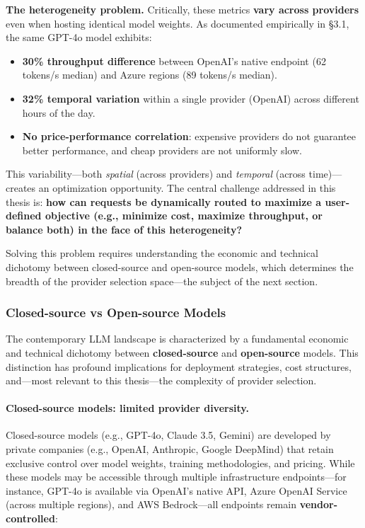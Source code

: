 \documentclass[english]{article}
\begin{document}
\medskip

\noindent\textbf{The heterogeneity problem.}
Critically, these metrics \textbf{vary across providers} even when hosting identical model weights. As documented empirically in §3.1, the same GPT-4o model exhibits:
\begin{itemize}
    \item \textbf{30\% throughput difference} between OpenAI's native endpoint (62 tokens/s median) and Azure regions (89 tokens/s median).
    \item \textbf{32\% temporal variation} within a single provider (OpenAI) across different hours of the day.
    \item \textbf{No price-performance correlation}: expensive providers do not guarantee better performance, and cheap providers are not uniformly slow.
\end{itemize}

This variability—both \emph{spatial} (across providers) and \emph{temporal} (across time)—creates an optimization opportunity. The central challenge addressed in this thesis is: \textbf{how can requests be dynamically routed to maximize a user-defined objective (e.g., minimize cost, maximize throughput, or balance both) in the face of this heterogeneity?}

Solving this problem requires understanding the economic and technical dichotomy between closed-source and open-source models, which determines the breadth of the provider selection space—the subject of the next section.

\subsubsection{Closed-source vs Open-source Models}

The contemporary LLM landscape is characterized by a fundamental economic and technical dichotomy between \textbf{closed-source} and \textbf{open-source} models. This distinction has profound implications for deployment strategies, cost structures, and—most relevant to this thesis—the complexity of provider selection.

\paragraph{Closed-source models: limited provider diversity.}

Closed-source models (e.g., GPT-4o, Claude 3.5, Gemini) are developed by private companies (e.g., OpenAI, Anthropic, Google DeepMind) that retain exclusive control over model weights, training methodologies, and pricing. While these models may be accessible through multiple infrastructure endpoints—for instance, GPT-4o is available via OpenAI's native API, Azure OpenAI Service (across multiple regions), and AWS Bedrock—all endpoints remain \textbf{vendor-controlled}:
\end{document}
